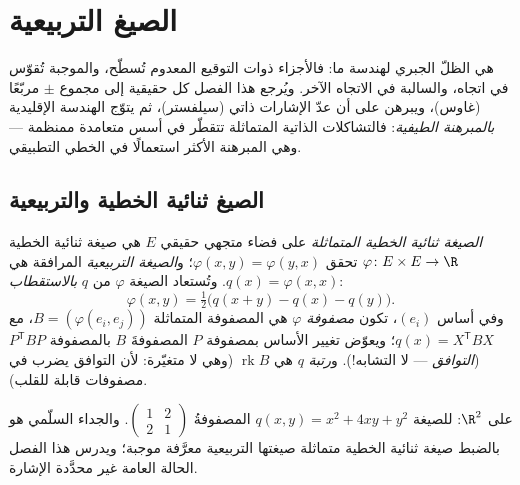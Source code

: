 \chapter{الصيغ التربيعية}\label{ch:b2:quadratic}

 هي الظلّ الجبري لهندسة ما: فالأجزاء ذوات
التوقيع المعدوم تُسطّح، والموجبة تُقوّس في اتجاه، والسالبة في
الاتجاه الآخر. ويُرجع هذا الفصل كل  حقيقية إلى مجموع
$\pm$ مربّعًا (غاوس)، ويبرهن على أن عدّ الإشارات ذاتي
(سيلفستر)، ثم يتوّج الهندسة الإقليدية
\emph{بالمبرهنة الطيفية}: فالتشاكلات الذاتية المتماثلة تتقطّر في
أسس متعامدة ممنظمة --- وهي المبرهنة الأكثر استعمالًا في  الخطي
التطبيقي.

\section{الصيغ ثنائية الخطية والتربيعية}

\begin{definition}\label{def:b2:quadratic:def}
\emph{الصيغة ثنائية الخطية المتماثلة} على فضاء متجهي حقيقي $E$ هي
صيغة ثنائية الخطية $\varphi \colon E \times E \to \R$ تحقق $\varphi(x, y) =
\varphi(y, x)$؛ و\emph{الصيغة
التربيعية} المرافقة هي $q(x) = \varphi(x, x)$. وتُستعاد الصيغة
$\varphi$ من $q$ \emph{بالاستقطاب}:
\[
\varphi(x, y) = \tfrac12\bigl(q(x + y) - q(x) - q(y)\bigr).
\]
وفي أساس $(e_i)$، تكون \emph{مصفوفة} $\varphi$ هي المصفوفة المتماثلة
$B = (\varphi(e_i, e_j))$، مع $q(x) = X^{\mathsf T} B X$؛ ويعوّض
تغيير الأساس بمصفوفة $P$ المصفوفةَ $B$ بالمصفوفة $P^{\mathsf T} B P$
(\emph{التوافق} --- لا التشابه!).
و\emph{رتبة} $q$ هي $\operatorname{rk} B$ (وهي لا متغيّرة:
لأن التوافق يضرب في مصفوفات قابلة للقلب).
\end{definition}

\begin{example}
على $\R^2$: للصيغة $q(x, y) = x^2 + 4xy + y^2$ المصفوفةُ $\begin{pmatrix}
1 & 2\\ 2 & 1\end{pmatrix}$. والجداء السلّمي هو بالضبط
صيغة ثنائية الخطية متماثلة صيغتها التربيعية معرَّفة موجبة؛
ويدرس هذا الفصل الحالة العامة غير محدَّدة الإشارة.
\end{example}

